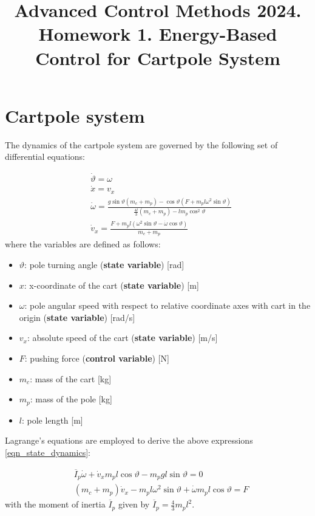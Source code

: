 \documentclass[12pt]{article}
\title{Advanced Control Methods 2024. Homework 1. Energy-Based Control for Cartpole System}
\begin{document}
\section*{Cartpole system}

The dynamics of the cartpole system are governed by the following set of differential equations:

\begin{equation}
    \label{eqn_state_dynamics}
    \begin{aligned}
        &\dot{\vartheta} =  \omega \\
        &\dot{x} = v_x \\
        &\dot{\omega} =  \frac{g \sin{\vartheta}(m_c + m_p) - \cos{\vartheta}(F + m_p l \omega^2 \sin{\vartheta})}{\frac{4l}{3}(m_c + m_p) - lm_p \cos^2{\vartheta}}\\
        &\dot{v}_x = \frac{F + m_p l (\omega ^2 \sin{\vartheta} - \dot{\omega}   \cos{\vartheta})}{m_c + m_p}
    \end{aligned}
\end{equation}
where the variables are defined as follows:
\begin{itemize}
\item $\vartheta$: pole turning angle (\textbf{state variable}) [rad]
\item $x$: x-coordinate of the cart (\textbf{state variable}) [m]
\item $\omega$: pole angular speed with respect to relative coordinate axes with cart in the origin (\textbf{state variable}) [rad/s]
\item $v_x$: absolute speed of the cart (\textbf{state variable}) [m/s]
\item $F$: pushing force (\textbf{control variable}) [N]
\item $m_c$: mass of the cart [kg]
\item $m_p$: mass of the pole [kg]
\item $l$: pole length [m]
  
\end{itemize}
Lagrange's equations are employed to derive the above expressions \eqref{eqn_state_dynamics}:

\begin{eqnarray}
\label{eqn_sum_moments}
& \overline{I}_p \dot{\omega} + \dot{v}_x m_p l\cos \vartheta  - m_p g l \sin \vartheta = 0 \\ 
\label{eqn_2nd_newton_law}
& (m_c + m_p) \dot{v}_x - m_p l \omega^2 \sin \vartheta + \dot{\omega} m_p l \cos \vartheta  = F
\end{eqnarray}
with the moment of inertia $\overline{I}_p$ given by $\overline{I}_p  = \frac{4}{3}m_p l ^ 2 $.
\end{document}
